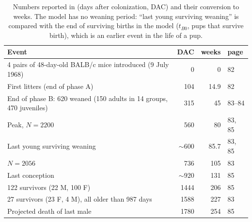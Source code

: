 \begin{table}[t]
\centering\small
\caption{Numbers reported in \cite{Calhoun1973} (days after colonization, DAC) and their conversion to weeks.
The model has no weaning period: ``last young surviving weaning'' is compared with the end of surviving births in the model
($t_{B0}$, pups that survive birth), which is an earlier event in the life of a pup.}
\label{tab:calhoun-numbers}
\begin{tabular}{@{}lrrl@{}}
\toprule
Event & DAC & weeks & page \\
\midrule
4 pairs of 48-day-old BALB/c mice introduced (9 July 1968) & 0 & 0 & 82 \\
First litters (end of phase A) & 104 & 14.9 & 82 \\
End of phase B: 620 weaned (150 adults in 14 groups, 470 juveniles) & 315 & 45 & 83--84 \\
Peak, $N=2200$ & 560 & 80 & 83, 85 \\
Last young surviving weaning & ${\sim}600$ & 85.7 & 83, 85 \\
$N=2056$ & 736 & 105 & 83 \\
Last conception & ${\sim}920$ & 131 & 85 \\
122 survivors (22 M, 100 F) & 1444 & 206 & 85 \\
27 survivors (23 F, 4 M), all older than 987 days & 1588 & 227 & 83 \\
Projected death of last male & 1780 & 254 & 85 \\
\bottomrule
\end{tabular}
\end{table}
